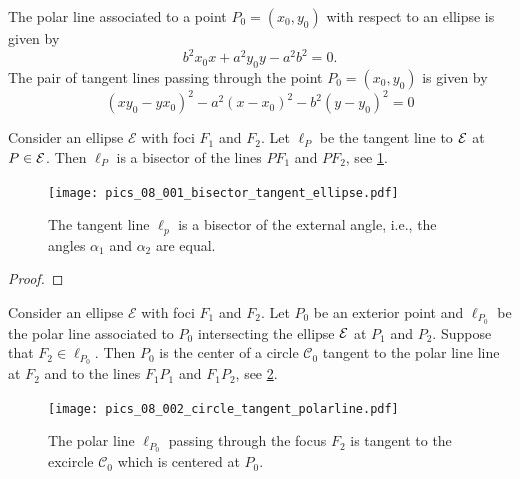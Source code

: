 
 The polar line associated to a point $P_0=(x_0,y_0)$ with respect to an ellipse is given by
 \[ b^2x_0 x+a^2 y_0y-a^2b^2=0.\]
The pair of tangent lines passing through the point $P_0=(x_0,y_0)$ is given by
 \[ \left( x{ y_0}-y{x_0} \right) ^{2}-{a}^{2} \left( x-{  x_0}
 \right) ^{2}-{b}^{2} \left( y-{ y_0} \right) ^{2}=0 \]

\begin{proposition}\label{prop:bisectorline}
    Consider an ellipse $\mathcal{E}$ with foci $F_1$ and $F_2$. Let $\ell_P$ be the tangent line to $\mathcal{E}$ at $P\in \mathcal{E}$. Then $\ell_P$ is a bisector of the   lines $PF_1$ and $PF_2$, see \cref{fig:bisectorline}.  
\end{proposition}
\begin{figure} 
	\begin{center}
		 \texttt{[image: pics\_08\_001\_bisector\_tangent\_ellipse.pdf]}
		\caption {The tangent line $\ell_p$ is a bisector of the external angle, i.e., the angles $\alpha_1$ and $\alpha_2$ are equal. 	\label{fig:bisectorline} }
	\end{center}

\end{figure}

\begin{proof}

\end{proof}


\begin{proposition}\label{prop:circle_polarline}
    Consider an ellipse $\mathcal{E}$ with foci $F_1$ and $F_2$. Let $ P_0 $ be an exterior point and $\ell_{P_0}$ be the polar line associated to $P_0$ intersecting the ellipse $\mathcal{E}$ at $P_1$ and $P_2$. Suppose that $F_2\in \ell_{P_0}$. Then $P_0$ is  the center of a circle $\mathcal{C}_0$  tangent to the polar line line at $F_2$ and to the lines $F_1P_1$ and $F_1P_2$,   see \cref{fig:circle_polarline}.  
\end{proposition}
\begin{figure} 
	\begin{center}
		 \texttt{[image: pics\_08\_002\_circle\_tangent\_polarline.pdf]}
		\caption {The polar line $\ell_{P_0}$ passing through the focus $F_2$ is tangent to the excircle $\mathcal{C}_0$ which is centered at $P_0$.	\label{fig:circle_polarline} }
	\end{center}

\end{figure}

